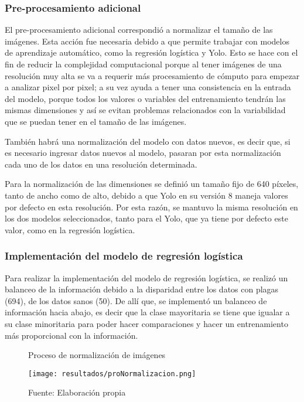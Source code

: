 \subsubsection{Pre-procesamiento adicional}

El pre-procesamiento adicional correspondió a normalizar el tamaño de las imágenes. Esta acción fue necesaria debido a que permite trabajar con modelos de aprendizaje automático, como la regresión logística y Yolo. Esto se hace con el fin de reducir la complejidad computacional porque al tener imágenes de una resolución muy alta se va a requerir más procesamiento de cómputo para empezar a analizar pixel por pixel; a su vez ayuda a tener una consistencia en la entrada del modelo, porque todos los valores o variables del entrenamiento tendrán las mismas dimensiones y así se evitan problemas relacionados con la variabilidad que se puedan tener en el tamaño de las imágenes.

También habrá una normalización del modelo con datos nuevos, es decir que, si es necesario ingresar datos nuevos al modelo, pasaran por esta normalización cada uno de los datos en una resolución determinada.

Para la normalización de las dimensiones se definió un tamaño fijo de 640 píxeles, tanto de ancho como de alto, debido a que Yolo en su versión 8 maneja valores por defecto en esta resolución. Por esta razón, se mantuvo la misma resolución en los dos modelos seleccionados, tanto para el Yolo, que ya tiene por defecto este valor, como en la regresión logística.

\subsubsection{Implementación del modelo de regresión logística}

Para realizar la implementación del modelo de regresión logística, se realizó un balanceo de la información debido a la disparidad entre los datos con plagas (694), de los datos sanos (50). De allí que, se implementó un balanceo de información hacia abajo, es decir que la clase mayoritaria se tiene que igualar a su clase minoritaria para poder hacer comparaciones y hacer un entrenamiento más proporcional con la información.

\begin{figure}[h]
\centering
\caption{Proceso de normalización de imágenes}
\texttt{[image: resultados/proNormalizacion.png]}
\caption*{\footnotesize Fuente: Elaboración propia}
\label{fig:figuraProNormalizacion}
\end{figure}

